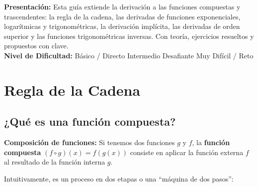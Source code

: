 \documentclass[12pt, letterpaper]{article}
\begin{document}

\vspace{4pt}
\begin{cuadroinfo}
  \small
  \textbf{Presentación:} Esta guía extiende la derivación a las funciones compuestas y trascendentes: la regla de la cadena, las derivadas de funciones exponenciales, logarítmicas y trigonométricas, la derivación implícita, las derivadas de orden superior y las funciones trigonométricas inversas. Con teoría, ejercicios resueltos y propuestos con clave.
  \\[4pt]
  \textbf{Nivel de Dificultad:}\quad
  \facil{} Básico / Directo \quad
  \medio{} Intermedio \quad
  \dificil{} Desafiante \quad
  \muyDificil{} Muy Difícil / Reto
\end{cuadroinfo}

\vspace{8pt}

\section{Regla de la Cadena}

\subsection{¿Qué es una función compuesta?}

\begin{cuadroteoria}
  \textbf{Composición de funciones:} Si tenemos dos funciones $g$ y $f$, la \textbf{función compuesta} $(f \circ g)(x) = f(g(x))$ consiste en aplicar la función externa $f$ al resultado de la función interna $g$.

  Intuitivamente, es un proceso en dos etapas o una ``máquina de dos pasos'':
  \begin{center}
  \end{center}
\end{cuadroteoria}
\end{document}
